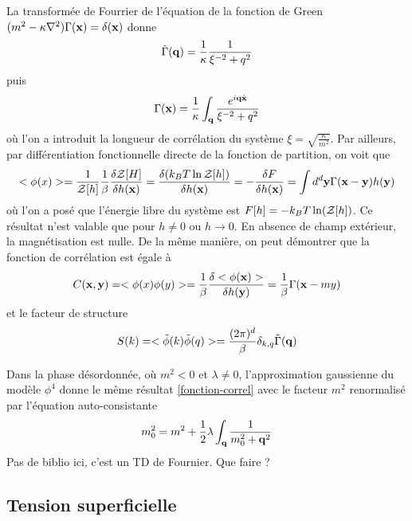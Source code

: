 La transformée de Fourrier de l'équation de la fonction de Green $(m^2-\kappa \nabla^2) \Gamma({\bf x}) = \delta({\bf x})$ donne
\begin{align}
    \tilde{\Gamma}({\bf q}) = \frac{1}{\kappa} \frac{1}{\xi^{-2} +  q^2}
\end{align}
puis
\begin{align}
    \Gamma({\bf x}) = \frac{1}{\kappa} \int_{\bf q} \frac{e^{i {\bf q} \dot {{\bf x}}}}{\xi^{-2} +  q^2}
    \label{fonction-correl}
\end{align}
où l'on a introduit la longueur de corrélation du système $\xi = \sqrt{\frac{\kappa}{m^2}}$.
Par ailleurs, par différentiation fonctionnelle directe de la fonction de partition, on voit que
\begin{align}
    <\phi(x)> = \frac{1}{\mathcal{Z}[h]} \frac{1}{\beta} \frac{\delta \mathcal{Z}[H]}{\delta h({\bf x})} = \frac{\delta (k_B T \ln \mathcal{Z}[h])}{\delta h({\bf x})} = - \frac{\delta F}{\delta h({\bf x})} = \int d^d {\bf y} \Gamma({\bf x}-{\bf y}) h({\bf y})
\end{align} 
où l'on a posé que l'énergie libre du système est $F[h] = -k_B T \ln(\mathcal{Z}[h])$. Ce résultat n'est valable que pour $h \neq 0$ ou $h \to 0$. En absence de champ extérieur, la magnétisation est nulle.
De la même manière, on peut démontrer que la fonction de corrélation est égale à 
\begin{align}
    C({\bf x},{\bf y}) =  <\phi(x)\phi(y)> = \frac{1}{\beta} \frac{\delta <\phi({\bf x})>}{\delta h({\bf y})} = \frac{1}{\beta} \Gamma({\bf x}-my)
\end{align}
et le facteur de structure
\begin{align}
    S(k) = < \tilde{\phi}(k)\tilde{\phi}(q)> = \frac{(2\pi)^d}{\beta} \delta_{k,q}  \tilde{\Gamma}({\bf q})
\end{align}

Dans la phase désordonnée, où $m^2 \less 0$ et $\lambda \neq 0$, l'approximation gaussienne du modèle $\phi^4$ donne le même résultat \ref{fonction-correl} avec le facteur $m^2$ renormalisé par l'équation auto-consistante
\begin{align}
    m^2_0 = m^2 + \frac{1}{2} \lambda \int_{\bf q} \frac{1}{m^2_0+{\bf q}^2}
\end{align}
{\color{red} Pas de biblio ici, c'est un TD de Fournier. Que faire ? }

    \subsection{Tension superficielle}

